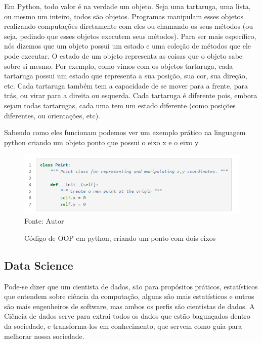         Em Python, todo valor é na verdade um objeto. Seja uma tartaruga, uma lista, ou mesmo um inteiro, todos são objetos. Programas manipulam esses objetos realizando computações diretamente com eles ou chamando os seus métodos (ou seja, pedindo que esses objetos executem seus métodos). Para ser mais específico, nós dizemos que um objeto possui um estado e uma coleção de métodos que ele pode executar. O estado de um objeto representa as coisas que o objeto sabe sobre si mesmo. Por exemplo, como vimos com os objetos tartaruga, cada tartaruga possui um estado que representa a sua posição, sua cor, sua direção, etc. Cada tartaruga também tem a capacidade de se mover para a frente, para trás, ou virar para a direita ou esquerda. Cada tartaruga é diferente pois, embora sejam todas tartarugas, cada uma tem um estado diferente (como posições diferentes, ou orientações, etc).
        
        Sabendo como eles funcionam podemos ver um exemplo prático na linguagem python criando um objeto ponto que possui o eixo x e o eixo y
        
    \begin{figure}[H]
    \begin{center}
        \caption{Código de OOP em python, criando um ponto com dois eixos} \label{ling1}
        \includegraphics[width=12cm]{Pictures/poo-python.png} \\
        {\tiny \sf Fonte: Autor }
    \end{center}
   \end{figure}
        
        \newpage
        \subsection{ Data Science }
        
        \cite{Int06} Pode-se dizer que um cientista de dados, são para propósitos práticos, estatísticos que entendem sobre ciência da computação, alguns são mais estatísticos e outros são mais engenheiros de software, mas ambos os perfis são cientistas de dados.
        A Ciência de dados serve para extrai todos os dados que estão bagunçados dentro da sociedade, e transforma-los em conhecimento, que servem como guia para melhorar nossa sociedade.
        
